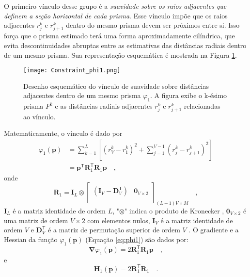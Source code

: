 O primeiro vínculo desse grupo é a \textit{suavidade sobre os raios adjacentes que definem a seção horizontal de cada prisma}. Esse vínculo impõe que os raios adjacentes $r_{j}^{k}$ e $r_{j+1}^{k}$ dentro do mesmo prisma devem ser próximos entre si. Isso força que o prisma estimado terá uma forma aproximadamente cilíndrica, que evita descontinuidades abruptas entre as estimativas das distâncias radiais dentro de um mesmo prisma. Sua representação esquemática é mostrada na Figura \ref{fig:phi1}.

\begin{figure}[!htb]
	\centering
	\texttt{[image: Constraint\_phi1.png]}
	\caption{Desenho esquemático do vínculo de suavidade sobre distâncias adjacentes dentro de um mesmo prisma $\varphi_{1}$. A figura exibe o k-ésimo prisma $P^k$ e as distâncias radiais adjacentes $r_j^k$ e $r_{j+1}^k$ relacionadas ao vínculo.}
	\label{fig:phi1}
\end{figure}

Matematicamente, o vínculo é dado por \begin{equation}\label{eq:phi1}
\begin{split}
\varphi_{1}(\mathbf{p}) &= \sum\limits^{L}_{k=1}\left[\left(r^{k}_{V}-r^{k}_{1}\right)^2 + \sum\limits^{V-1}_{j=1}\left(r^{k}_{j}-r^{k}_{j+1}\right)^2\right]\\
&= \mathbf{p}^{\mathsf{T}} \mathbf{R}^{\mathsf{T}}_{1}\mathbf{R}_{1} \mathbf{p} \quad ,
\end{split}
\end{equation}
onde
\begin{equation}
\mathbf{R}_{1} = 
\mathbf{I}_{L} \otimes 
\begin{bmatrix}
\left( \mathbf{I}_{V} - \mathbf{D}_{V}^\mathsf{T} \right) & \mathbf{0}_{V \times 2} \\
\end{bmatrix}_{(L-1)V \times M} \quad ,
\label{eq:S1-matrix}
\end{equation}
$\mathbf{I}_{L}$ é a matriz identidade de ordem $L$, "$\otimes$" indica o produto de Kronecker \cite[][ p. 243]{horn_johnson1991}, $\mathbf{0}_{V \times 2}$ é uma matriz de ordem $V \times 2$ com elementos nulos, 
$\mathbf{I}_{V}$ é a matriz identidade de ordem $V$ e $\mathbf{D}_{V}^\mathsf{T}$ é a matriz de permutação superior de ordem $V$ \cite[][ p. 20]{golub-vanloan2013}. O gradiente e a Hessian da função $\varphi_{1}(\mathbf{p})$ (Equação \ref{eq:phi1}) são dados por:
\begin{equation}\label{eq:phi1_grad}
\boldsymbol{\nabla}\varphi_{1}(\mathbf{p}) = 2 \mathbf{R}^\mathsf{T}_{1}\mathbf{R}_{1}\mathbf{p} \quad ,
\end{equation}
e
\begin{equation}\label{eq:phi1_hessian}
\mathbf{H}_{1}(\mathbf{p}) = 2\mathbf{R}^\mathsf{T}_{1}\mathbf{R}_{1} \quad .
\end{equation}

